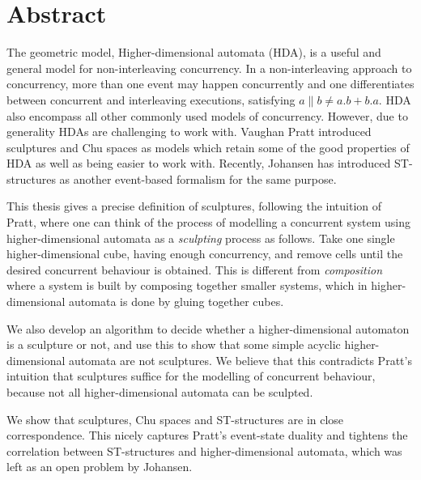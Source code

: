 
\chapter*{Abstract}
\addchaptertocentry{\abstractname} %
    
    The geometric model, Higher-dimensional automata (HDA), is a useful and general model for non-interleaving concurrency. In a non-interleaving approach to concurrency, more than one event may happen concurrently and one differentiates between concurrent and interleaving executions, satisfying $a \parallel b \neq a.b + b.a$. HDA also encompass all other commonly used models of concurrency. However, due to generality HDAs are challenging to work with. Vaughan Pratt introduced sculptures and Chu spaces as models which retain some of the good properties of HDA as well as being easier to work with. Recently, Johansen has introduced ST-structures as another event-based formalism for the same purpose.
    
    This thesis gives a precise definition of sculptures, following the intuition of Pratt, where one can think of the process of modelling a concurrent system using higher-dimensional automata as a \emph{sculpting} process as follows. Take one single higher-dimensional cube, having enough concurrency, and remove cells until the desired concurrent behaviour is obtained. This is different from \emph{composition} where a system is built by composing together smaller systems, which in higher-dimensional automata is done by gluing together cubes.
    
    We also develop an algorithm to decide whether a higher-dimensional automaton is a sculpture or not, and use this to show that some simple acyclic higher-dimensional automata are not sculptures. We believe that this contradicts Pratt's intuition that sculptures suffice for the modelling of concurrent behaviour, because not all higher-dimensional automata can be sculpted.
    
    We show that sculptures, Chu spaces and ST-structures are in close correspondence. This nicely captures Pratt's event-state duality and tightens the correlation between ST-structures and higher-dimensional automata, which was left as an open problem by Johansen.